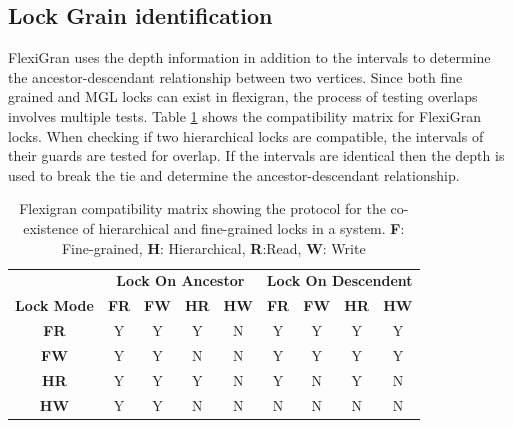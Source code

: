 \subsection{Lock Grain identification}
FlexiGran uses the depth information in addition to the intervals to determine the ancestor-descendant relationship between two vertices. Since both fine grained and MGL locks can exist in flexigran, the process of testing overlaps involves multiple tests. Table \ref{tab:flexigran_locks} shows the compatibility matrix for FlexiGran locks. When checking if two hierarchical locks are compatible, the intervals of their guards are tested for overlap. If the intervals are identical then the depth is used to break the tie and determine the ancestor-descendant relationship. 

\begin{table}[h]
    \centering
    \captionsetup{justification=centering}
    \begin{tabular}{c|cccc|cccc|}
        \multicolumn{1}{c}{} & \multicolumn{4}{c|}{\textbf{Lock On Ancestor}} & \multicolumn{4}{c}{\textbf{Lock On Descendent}} \\
        \cline{2-9}
        \textbf{Lock Mode} & \textbf{FR} & \textbf{FW} & \textbf{HR} & \textbf{HW} & \textbf{FR} & \textbf{FW} & \textbf{HR} & \textbf{HW} \\
        \hline
        \textbf{FR} & \cellcolor{green!25} Y & \cellcolor{green!25} Y & \cellcolor{green!25} Y & \cellcolor{red!25} N & \cellcolor{green!25} Y & \cellcolor{green!25} Y & \cellcolor{green!25} Y & \cellcolor{green!25} Y \\
        \textbf{FW} & \cellcolor{green!25} Y & \cellcolor{green!25} Y & \cellcolor{red!25} N & \cellcolor{red!25} N & \cellcolor{green!25} Y & \cellcolor{green!25} Y & \cellcolor{green!25} Y & \cellcolor{green!25} Y \\
        \textbf{HR} & \cellcolor{green!25} Y & \cellcolor{green!25} Y & \cellcolor{green!25} Y & \cellcolor{red!25} N & \cellcolor{green!25} Y & \cellcolor{red!25} N & \cellcolor{green!25} Y & \cellcolor{red!25} N \\
        \textbf{HW} & \cellcolor{green!25} Y & \cellcolor{green!25} Y & \cellcolor{red!25} N & \cellcolor{red!25} N & \cellcolor{red!25} N & \cellcolor{red!25} N & \cellcolor{red!25} N & \cellcolor{red!25} N \\
    \end{tabular}
    \caption{Flexigran compatibility matrix showing the protocol for the co-existence of hierarchical and fine-grained locks in a system. \textbf{F}: Fine-grained, \textbf{H}: Hierarchical, \textbf{R}:Read, \textbf{W}: Write}
    \label{tab:flexigran_locks}
\end{table}

